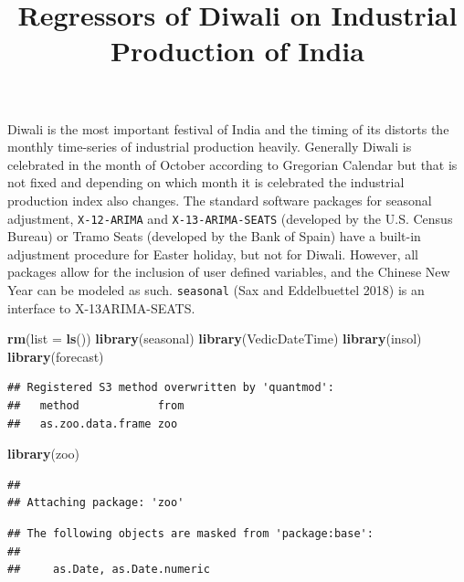 \documentclass[
]{article}
\title{Regressors of Diwali on Industrial Production of India}
\author{}
\date{\vspace{-2.5em}}
\newenvironment{Shaded}{\begin{snugshade}}{\end{snugshade}}
\newcommand{\AttributeTok}[1]{\textcolor[rgb]{0.13,0.29,0.53}{#1}}
\newcommand{\ConstantTok}[1]{\textcolor[rgb]{0.56,0.35,0.01}{#1}}
\newcommand{\FunctionTok}[1]{\textcolor[rgb]{0.13,0.29,0.53}{\textbf{#1}}}
\newcommand{\NormalTok}[1]{#1}
\newcommand{\SpecialCharTok}[1]{\textcolor[rgb]{0.81,0.36,0.00}{\textbf{#1}}}
\begin{document}
\maketitle

Diwali is the most important festival of India and the timing of its
distorts the monthly time-series of industrial production heavily.
Generally Diwali is celebrated in the month of October according to
Gregorian Calendar but that is not fixed and depending on which month it
is celebrated the industrial production index also changes. The standard
software packages for seasonal adjustment, \texttt{X-12-ARIMA} and
\texttt{X-13-ARIMA-SEATS} (developed by the U.S. Census Bureau) or Tramo
Seats (developed by the Bank of Spain) have a built-in adjustment
procedure for Easter holiday, but not for Diwali. However, all packages
allow for the inclusion of user defined variables, and the Chinese New
Year can be modeled as such. \texttt{seasonal} (Sax and Eddelbuettel
2018) is an interface to X-13ARIMA-SEATS.

\begin{Shaded}
\begin{Highlighting}[]
\FunctionTok{rm}\NormalTok{(}\AttributeTok{list =} \FunctionTok{ls}\NormalTok{())}
\FunctionTok{library}\NormalTok{(seasonal)}
\FunctionTok{library}\NormalTok{(VedicDateTime)}
\FunctionTok{library}\NormalTok{(insol)}
\FunctionTok{library}\NormalTok{(forecast)}
\end{Highlighting}
\end{Shaded}

\begin{verbatim}
## Registered S3 method overwritten by 'quantmod':
##   method            from
##   as.zoo.data.frame zoo
\end{verbatim}

\begin{Shaded}
\begin{Highlighting}[]
\FunctionTok{library}\NormalTok{(zoo)}
\end{Highlighting}
\end{Shaded}

\begin{verbatim}
## 
## Attaching package: 'zoo'
\end{verbatim}

\begin{verbatim}
## The following objects are masked from 'package:base':
## 
##     as.Date, as.Date.numeric
\end{verbatim}

\begin{Shaded}
\end{Shaded}
\end{document}
